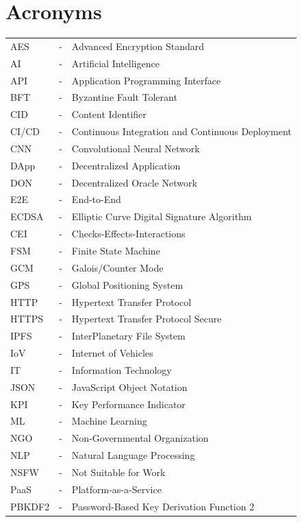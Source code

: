 \chapter*{Acronyms}

\setlength{\LTleft}{0pt}
\setlength{\LTright}{0pt}
\noindent
\begin{longtable}{@{}lcl@{}}
AES     & - & Advanced Encryption Standard\\
AI      & - & Artificial Intelligence\\
API     & - & Application Programming Interface\\
BFT     & - & Byzantine Fault Tolerant\\
CID     & - & Content Identifier\\
CI/CD   & - & Continuous Integration and Continuous Deployment\\
CNN     & - & Convolutional Neural Network\\
DApp    & - & Decentralized Application\\
DON     & - & Decentralized Oracle Network\\
E2E     & - & End-to-End\\
ECDSA   & - & Elliptic Curve Digital Signature Algorithm\\
CEI     & - & Checks-Effects-Interactions\\
FSM     & - & Finite State Machine\\
GCM     & - & Galois/Counter Mode\\
GPS     & - & Global Positioning System\\
HTTP    & - & Hypertext Transfer Protocol\\
HTTPS   & - & Hypertext Transfer Protocol Secure\\
IPFS    & - & InterPlanetary File System\\
IoV     & - & Internet of Vehicles\\
IT      & - & Information Technology\\
JSON    & - & JavaScript Object Notation\\
KPI     & - & Key Performance Indicator\\
ML      & - & Machine Learning\\
NGO     & - & Non-Governmental Organization\\
NLP     & - & Natural Language Processing\\
NSFW    & - & Not Suitable for Work\\
PaaS    & - & Platform-as-a-Service\\
PBKDF2  & - & Password-Based Key Derivation Function 2\\

\end{longtable}
